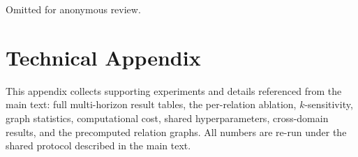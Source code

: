 \documentclass[letterpaper]{article}   %
\begin{document}
Omitted for anonymous review.





\clearpage
\appendix
\onecolumn
\section{Technical Appendix}
\label{sec:appendix}
This appendix collects supporting experiments and details referenced from the main
text: full multi-horizon result tables, the per-relation ablation, $k$-sensitivity,
graph statistics, computational cost, shared hyperparameters, cross-domain results,
and the precomputed relation graphs. All numbers are re-run under the shared protocol
described in the main text.




\end{document}

